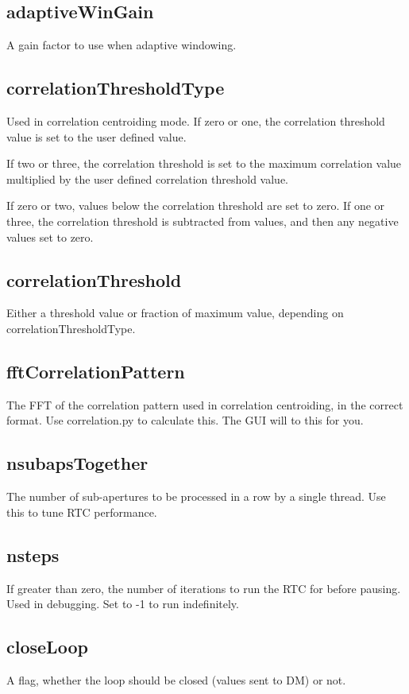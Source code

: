 \documentclass[a4,10pt]{article}
\begin{document}
\subsection{adaptiveWinGain}
A gain factor to use when adaptive windowing.

\subsection{correlationThresholdType}
Used in correlation centroiding mode.
If zero or one, the correlation threshold value is set to
the user defined value.

If two or three, the correlation threshold is set to the maximum
correlation value multiplied by the user defined correlation threshold
value.

If zero or two, values below the correlation threshold are set to
zero.  If one or three, the correlation threshold is subtracted from
values, and then any negative values set to zero.

\subsection{correlationThreshold}
Either a threshold value or fraction of maximum value, depending on
correlationThresholdType.

\subsection{fftCorrelationPattern}
The FFT of the correlation pattern used in correlation centroiding, in
the correct format.  Use correlation.py to calculate this.  The GUI
will to this for you.

\subsection{nsubapsTogether}
The number of sub-apertures to be processed in a row by a single
thread.  Use this to tune RTC performance.

\subsection{nsteps}
If greater than zero, the number of iterations to run the RTC for
before pausing.  Used in debugging.  Set to -1 to run indefinitely.

\subsection{closeLoop}
A flag, whether the loop should be closed (values sent to DM) or not.
\end{document}
